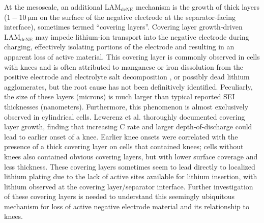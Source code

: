 \documentclass[journal=jpclcd,manuscript=article]{achemso}
\begin{document}
At the mesoscale, an additional $\mathrm{LAM_{deNE}}$ mechanism is the growth of thick layers ($1-10\: \mathrm{\mu m}$ on the surface of the negative electrode at the separator-facing interface), sometimes termed ``covering layers''\cite{lewerenz_post-mortem_2017, lewerenz_systematic_2017, willenberg_development_2020}.
Covering layer growth-driven $\mathrm{LAM_{deNE}}$ may impede lithium-ion transport into the negative electrode during charging, effectively isolating portions of the electrode and resulting in an apparent loss of active material. This covering layer is commonly observed in cells with knees and is often attributed to manganese or iron dissolution from the positive electrode and electrolyte salt decomposition \cite{lewerenz_post-mortem_2017,lewerenz_systematic_2017,zhu_investigation_2021,stiaszny_electrochemical_2014,rahe_nanoscale_2019,keil_linear_2019,sarasketa-zabala_understanding_2015, li_degradation_2016, klett_non-uniform_2014, klett_uneven_2015, willenberg_high-precision_2020, wang_cycle-life_2011, fang_capacity_2021}, or possibly dead lithium agglomerates\cite{schindler_fast_2018}, but the root cause has not been definitively identified. Peculiarly, the size of these layers (microns) is much larger than typical reported SEI thicknesses (nanometers)\cite{peled_reviewsei_2017}. Furthermore, this phenomenon is almost exclusively observed in cylindrical cells.
Lewerenz et al.\cite{lewerenz_post-mortem_2017,lewerenz_systematic_2017} thoroughly documented covering layer growth, finding that increasing C rate and larger depth-of-discharge could lead to earlier onset of a knee. Earlier knee onsets were correlated with the presence of a thick covering layer on cells that contained knees; cells without knees also contained obvious covering layers, but with lower surface coverage and less thickness. These covering layers sometimes seem to lead directly to localized lithium plating due to the lack of active sites available for lithium insertion, with lithium observed at the covering layer/separator interface.\cite{zhu_investigation_2021}
Further investigation of these covering layers is needed to understand this seemingly ubiquitous mechanism for loss of active negative electrode material and its relationship to knees.
\end{document}

